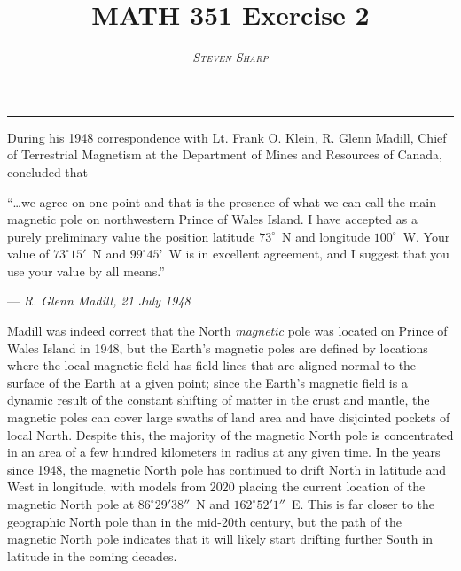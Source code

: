 \documentclass[10pt]{article}
\title{MATH 351 Exercise 2}
\author{\textsc{\textit{Steven Sharp}}}
\date{}
\begin{document}
\maketitle

\thispagestyle{empty}

\begin{center}
\rule{\textwidth}{0.5pt}
\end{center}

During his 1948 correspondence with Lt. Frank O. Klein, R. Glenn Madill, Chief of Terrestrial Magnetism at the Department of Mines and Resources of Canada, concluded that \vspace{1ex}

``\ldots we agree on one point and that is the presence of what we can call the main magnetic pole on northwestern Prince of Wales Island. I have accepted as a purely preliminary value the position latitude \mbox{$73^{\circ}$ N} and longitude \mbox{$100^{\circ}$ W}. Your value of \mbox{$73^{\circ} 15'$ N} and \mbox{$99^{\circ} 45’$ W} is in excellent agreement, and I suggest that you use your value by all means.''

\begin{flushright}
--- \textsl{R. Glenn Madill, 21 July 1948} \vspace{1ex}
\end{flushright}

\setlength{\parindent}{1.5eM}Madill was indeed correct that the North \textit{magnetic} pole was located on Prince of Wales Island in 1948, but the Earth's magnetic poles are defined by locations where the local magnetic field has field lines that are aligned normal to the surface of the Earth at a given point; since the Earth's magnetic field is a dynamic result of the constant shifting of matter in the crust and mantle, the magnetic poles can cover large swaths of land area and have disjointed pockets of local North. Despite this, the majority of the magnetic North pole is concentrated in an area of a few hundred kilometers in radius at any given time. In the years since 1948, the magnetic North pole has continued to drift North in latitude and West in longitude, with models from 2020 placing the current location of the magnetic North pole at \mbox{$86^{\circ} 29' 38''$ N} and \mbox{$162^{\circ} 52' 1''$ E}. This is far closer to the geographic North pole than in the mid-20th century, but the path of the magnetic North pole indicates that it will likely start drifting further South in latitude in the coming decades.
\end{document}
